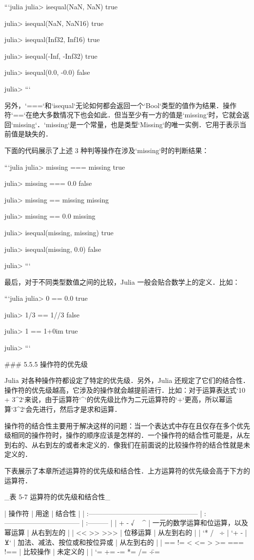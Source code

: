 ```julia
julia> isequal(NaN, NaN)
true

julia> isequal(NaN, NaN16)
true

julia> isequal(Inf32, Inf16)
true

julia> isequal(-Inf, -Inf32)
true

julia> isequal(0.0, -0.0)
false

julia> 
```

另外，`===`和`isequal`无论如何都会返回一个`Bool`类型的值作为结果．操作符`==`在绝大多数情况下也会如此．但当至少有一方的值是`missing`时，它就会返回`missing`．`missing`是一个常量，也是类型`Missing`的唯一实例．它用于表示当前值是缺失的．

下面的代码展示了上述 3 种判等操作在涉及`missing`时的判断结果：

```julia
julia> missing === missing
true

julia> missing === 0.0
false

julia> missing == missing
missing

julia> missing == 0.0
missing

julia> isequal(missing, missing)
true

julia> isequal(missing, 0.0)
false

julia> 
```

最后，对于不同类型数值之间的比较，Julia 一般会贴合数学上的定义．比如：

```julia
julia> 0 == 0.0
true

julia> 1/3 == 1//3
false

julia> 1 == 1+0im
true

julia> 
```

### 5.5.5 操作符的优先级

Julia 对各种操作符都设定了特定的优先级．另外，Julia 还规定了它们的结合性．操作符的优先级越高，它涉及的操作就会越提前进行．比如：对于运算表达式`10 + 3^2`来说，由于运算符`^`的优先级比作为二元运算符的`+`更高，所以幂运算`3^2`会先进行，然后才是求和运算．

操作符的结合性主要用于解决这样的问题：当一个表达式中存在且仅存在多个优先级相同的操作符时，操作的顺序应该是怎样的．一个操作符的结合性可能是，从左到右的、从右到左的或者未定义的．像我们在前面说的比较操作符的结合性就是未定义的．

下表展示了本章所述运算符的优先级和结合性．上方运算符的优先级会高于下方的运算符．

_表 5-7 运算符的优先级和结合性_

| 操作符                                            | 用途                               | 结合性     |
| :------------------------------------------------ | :--------------------------------- | :--------- |
| + - √ ~ ^                                         | 一元的数学运算和位运算，以及幂运算 | 从右到左的 |
| << >> >>>                                         | 位移运算                           | 从左到右的 |
| `* / \ ÷ %
| `+ - | ⊻`                                         | 加法、减法、按位或和按位异或       | 从左到右的 |
| == != < <= > >= === !==                           | 比较操作                           | 未定义的   |
| `= += -= *= /= \= ÷= %

